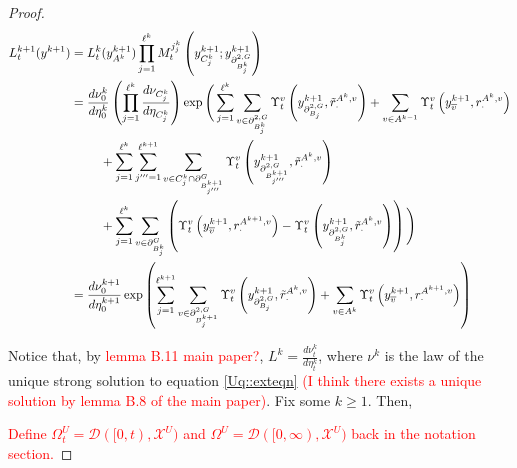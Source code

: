 \documentclass[12pt]{article}
\newcommand{\mc}{\mathcal}
\newcommand{\ov}{\overline}
\newcommand{\tr}{\textcolor{red}}
\newcommand{\cad}{\mc{D}}							%
\newcommand{\sta}{\mc{X}}							%
\newcommand{\gneigh}[2]{\partial^{#1}_{#2}}			%
\newcommand{\dgneigh}[2]{\partial^{2,#1}_{#2}}		%
\newcommand{\cl}[1]{\ov{#1}}						%
\newcommand{\indx}[1]{^{#1}}						%
\newcommand{\rate}{r}								%
\newcommand{\xg}{y}									%
\newcommand{\vind}[1]{_{#1}}						%
\newcommand{\vpara}[1]{^{#1}}						%
\newcommand{\stpara}[1]{_{#1}}						%
\newcommand{\tpara}[1]{_{#1}}						%
\newcommand{\gvpara}[2]{^{#1,#2}}					%
\newcommand{\psize}{\ell}							%
\newcommand{\brate}{\alt{\rate}}					%
\newcommand{\alt}[1]{\tilde{#1}}					%
\newcommand{\mm}{\nu}								%
\newcommand{\mmm}{\eta}								%
\newcommand{\ds}{\Upsilon}							%
\newcommand{\dense}{L}								%
\newcommand{\mdense}{M}								%
\newcommand{\jpara}[1]{^{#1}}						%
\begin{document}
\begin{proof}
\begin{align*}
\dense\indx{k+1}\tpara{t}(\xg\indx{k+1}) &= \dense\indx{k}\tpara{t}(\xg\indx{k+1}\vind{A\indx{k}})\prod_{j=1}^{\psize\indx{k}}\mdense\jpara{j\indx{k}_j}\tpara{t}\left(\xg\indx{k+1}\vind{C_j\indx{k}};\xg\indx{k+1}\vind{\dgneigh{G}{B\indx{k}_j}}\right)\\
&= \frac{d\mm\indx{k}\tpara{0}}{d\mmm\indx{k}\tpara{0}}\left(\prod_{j=1}^{\psize\indx{k}}\frac{d\mm\vind{C_j\indx{k}}}{d\mmm\vind{C_j\indx{k}}}\right)\exp\Bigg(\sum_{j=1}^{\psize\indx{k}}\sum_{v\in \dgneigh{G}{B_j\indx{k}}} \ds\vpara{v}\tpara{t}\left(\xg\indx{k+1}\vind{\dgneigh{G}{B_j}},\brate\gvpara{A\indx{k}}{v}\stpara{\cdot}\right) + \sum_{v \in A\indx{k-1}} \ds\vpara{v}\tpara{t}\left(\xg\indx{k+1}\vind{\cl{v}},\rate\gvpara{A\indx{k}}{v}\stpara{\cdot}\right)\\
&\hspace{24 pt} + \sum_{j=1}^{\psize\indx{k}}\sum_{j'''=1}^{\psize\indx{k+1}}\sum_{v \in C_j\indx{k}\cap\gneigh{G}{B_{j'''}\indx{k+1}}}\ds\vpara{v}\tpara{t}\left(\xg\indx{k+1}\vind{\dgneigh{G}{B_{j'''}\indx{k+1}}},\brate\gvpara{A\indx{k}}{v}\stpara{\cdot}\right)\\
&\hspace{24pt} + \sum_{j=1}^{\psize\indx{k}}\sum_{v \in \gneigh{G}{B_j\indx{k}}}\left(\ds\vpara{v}\tpara{t}\left(\xg\indx{k+1}\vind{\cl{v}},\rate\gvpara{A\indx{k+1}}{v}\stpara{\cdot}\right) - \ds\vpara{v}\tpara{t}\left(\xg\indx{k+1}\vind{\dgneigh{G}{B_j\indx{k}}},\brate\gvpara{A\indx{k}}{v}\stpara{\cdot}\right)\right)\Bigg)\\
&= \frac{d\mm\indx{k+1}\tpara{0}}{d\mmm\indx{k+1}\tpara{0}}\exp\left(\sum_{j=1}^{\psize\indx{k+1}}\sum_{v\in \dgneigh{G}{B_j\indx{k+1}}} \ds\vpara{v}\tpara{t}\left(\xg\indx{k+1}\vind{\dgneigh{G}{B_j}},\brate\gvpara{A\indx{k}}{v}\stpara{\cdot}\right) + \sum_{v \in A\indx{k}}\ds\vpara{v}\tpara{t}\left(\xg\vind{\cl{v}}\indx{k+1},\rate\gvpara{A\indx{k+1}}{v}\stpara{\cdot}\right)\right)
\end{align*}

Notice that, by \tr{lemma B.11 main paper?}, \(\dense\indx{k} = \frac{d\mm\indx{k}\tpara{t}}{d\mmm\indx{k}\tpara{t}}\), where \(\mm\indx{k}\) is the law of the unique strong solution to equation \eqref{Uq::exteqn} \tr{(I think there exists a unique solution by lemma B.8 of the main paper)}. Fix some \(k \geq 1\). Then,

\tr{Define \(\Omega\vpara{U}\tpara{t} = \cad([0,t),\sta^U)\) and \(\Omega\vpara{U} = \cad([0,\infty),\sta^U)\) back in the notation section.}


\end{proof}
\end{document}
